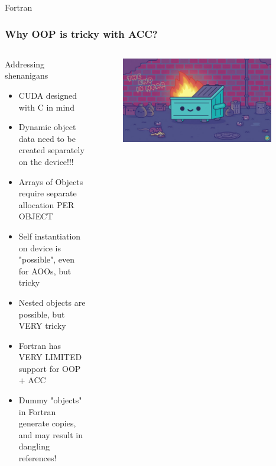 \begin{frame}
        \begin{block}{Fortran}
            
        \end{block}
\end{frame}

\begin{frame}
    \frametitle{Why OOP is tricky with ACC?}
    \begin{columns}
        \begin{alertblock}{Addressing shenanigans}
            \begin{itemize}
                \item CUDA designed with C in mind
                \item Dynamic object data need to be created separately on the device!!!
                \item Arrays of Objects require separate allocation PER OBJECT
                \item Self instantiation on device is "possible", even for AOOs, but tricky
                \item Nested objects are possible, but VERY tricky
                \item Fortran has VERY LIMITED support for OOP + ACC
                \item Dummy "objects" in Fortran generate copies, and may result in dangling references!
            \end{itemize}
        \end{alertblock}
        \begin{figure}
            \centering
            \includegraphics[width=0.95\textwidth]{images/dfire.jpg}
        \end{figure}
    \end{columns}
\end{frame}

